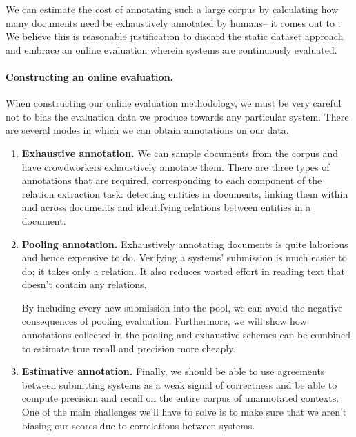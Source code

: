 We can estimate the cost of annotating such a large corpus by calculating how many documents need be exhaustively annotated by humans-- it comes out to . 
We believe this is reasonable justification to discard the static dataset approach and embrace an online evaluation wherein systems are continuously evaluated.

\paragraph{Constructing an online evaluation.}

When constructing our online evaluation methodology, we must be very careful not to bias the evaluation data we produce towards any particular system. 
There are several modes in which we can obtain annotations on our data.

\begin{enumerate}
  \item \textbf{Exhaustive annotation.} 
    We can sample documents from the corpus and have crowdworkers exhaustively annotate them.
    There are three types of annotations that are required, corresponding to each component of the relation extraction task:
    detecting entities in documents, linking them within and across documents and identifying relations between entities in a document. 
  \item \textbf{Pooling annotation.} 
    Exhaustively annotating documents is quite laborious and hence expensive to do.
    Verifying a systems' submission is much easier to do; it takes only  a relation.
    It also reduces wasted effort in reading text that doesn't contain any relations.

    By including every new submission into the pool, we can avoid the negative consequences of pooling evaluation.
    Furthermore, we will show how annotations collected in the pooling and exhaustive schemes can be combined to estimate true recall and precision more cheaply.

  \item \textbf{Estimative annotation.} 
    Finally, we should be able to use agreements between submitting systems as a weak signal of correctness and be able to compute precision and recall on the entire corpus of unannotated contexts.
    One of the main challenges  we'll have to solve is to make sure that we aren't biasing our scores due to correlations between systems. 

\end{enumerate}

